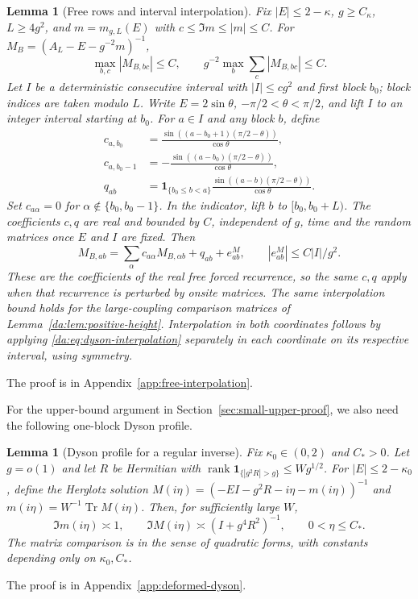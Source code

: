 \documentclass[11pt]{article}
\numberwithin{equation}{section}
\newtheorem{lemma}[theorem]{Lemma}
\theoremstyle{remark}
\newcommand{\Tr}{\operatorname{Tr}}
\newcommand{\rank}{\operatorname{rank}}
\newcommand{\one}{\mathbf 1}
\begin{document}
\begin{lemma}[Free rows and interval interpolation]\label{da:lem:free-interpolation}
Fix $|E|\le2-\kappa$, $g\ge C_\kappa$, $L\ge4g^2$, and
$m=m_{g,L}(E)$ with $c\le\Im m\le|m|\le C$.
For $M_B=(A_L-E-g^{-2}m)^{-1}$,
\begin{equation}\label{uvc:eq:free-row-bounds}
 \max_{b,c}|M_{B,bc}|\le C,\qquad
 g^{-2}\max_b\sum_c|M_{B,bc}|\le C.
\end{equation}
Let $I$ be a deterministic consecutive interval with $|I|\le cg^2$
and first block $b_0$; block indices are taken modulo $L$.
Write $E=2\sin\theta$, $-\pi/2<\theta<\pi/2$, and lift $I$ to an
integer interval starting at $b_0$. For $a\in I$ and any block $b$, define
\begin{equation}\label{da:eq:cell-interpolation-coefficients}
 \begin{aligned}
 c_{a,b_0}&=\frac{\sin((a-b_0+1)(\pi/2-\theta))}{\cos\theta},\\
 c_{a,b_0-1}&=-\frac{\sin((a-b_0)(\pi/2-\theta))}{\cos\theta},\\
 q_{ab}&=\one_{\{b_0\le b<a\}}
          \frac{\sin((a-b)(\pi/2-\theta))}{\cos\theta}.
 \end{aligned}
\end{equation}
Set $c_{a\alpha}=0$ for $\alpha\notin\{b_0,b_0-1\}$.
In the indicator, lift $b$ to $[b_0,b_0+L)$. The coefficients $c,q$
are real and bounded by $C$, independent of $g$, time and the random matrices
once $E$ and $I$ are fixed. Then
\begin{equation}\label{da:eq:dyson-interpolation}
 M_{B,ab}=\sum_\alpha c_{a\alpha}M_{B,\alpha b}+q_{ab}+e^M_{ab},\qquad
 |e^M_{ab}|\le C|I|/g^2.
\end{equation}
These are the coefficients of the real free forced recurrence, so the
same $c,q$ apply when that recurrence is perturbed by onsite matrices.
The same interpolation bound holds for the large-coupling
comparison matrices of Lemma~\ref{da:lem:positive-height}.
Interpolation in both coordinates follows by applying
\eqref{da:eq:dyson-interpolation} separately in each coordinate on its
respective interval, using symmetry.
\end{lemma}
The proof is in Appendix~\ref{app:free-interpolation}.

For the upper-bound argument in Section~\ref{sec:small-upper-proof},
we also need the following one-block Dyson profile.

\begin{lemma}[Dyson profile for a regular inverse]\label{da:lem:regular-dyson-profile}
Fix $\kappa_0\in(0,2)$ and $C_*>0$. Let $g=o(1)$ and let $R$ be
Hermitian with $\rank\one_{\{|g^2R|>g\}}\le Wg^{1/2}$.
For $|E|\le2-\kappa_0$, define the Herglotz solution
$M(i\eta)=(-EI-g^2R-i\eta-m(i\eta))^{-1}$ and
$m(i\eta)=W^{-1}\Tr M(i\eta)$. Then, for sufficiently large $W$,
\begin{equation}\label{us:eq:mde}
 \Im m(i\eta)\asymp1,\qquad
 \Im M(i\eta)\asymp(I+g^4R^2)^{-1},\qquad 0<\eta\le C_*.
\end{equation}
The matrix comparison is in the sense of quadratic forms, with constants
depending only on $\kappa_0,C_*$.
\end{lemma}
The proof is in Appendix~\ref{app:deformed-dyson}.
\end{document}
